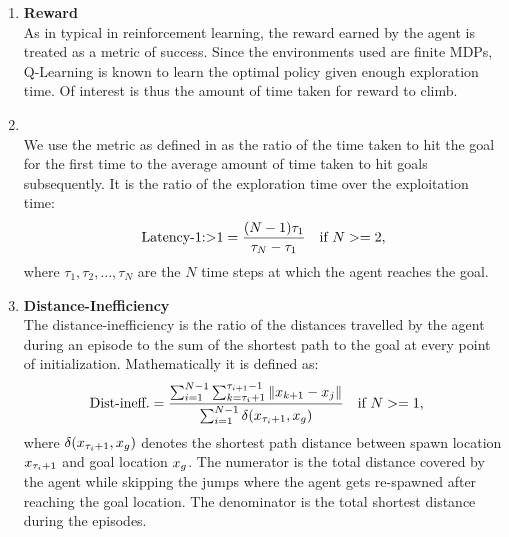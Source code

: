 \begin{enumerate}
    \item \textbf{Reward}\\\noindent
        As in typical in reinforcement learning, the reward earned by
        the agent is treated as a metric of success. Since the
        environments used are finite MDPs, Q-Learning is known to learn
        the optimal policy given enough exploration time. Of interest is
        thus the amount of time taken for reward to climb.

    \item \textbf{\Loo}\\
        We use the metric \Loo as defined in \cite{MiPaViICLR2017} as the ratio
        of the time taken to hit the goal for the first time to the average
        amount of time taken to hit goals subsequently. It
        is the ratio of the exploration time over the exploitation time:
		\begin{align}
			\text{Latency-1:\textgreater1} &= 
			\frac{(N-1) \tau_1}{\tau_{N} - \tau_1} & \text{if }  N >= 2,
		\end{align}%
        where $\tau_1, \tau_2, \dots, \tau_N$ are the $N$ time steps at which
        the agent reaches the goal.


    \item \textbf{Distance-Inefficiency}\\
        The distance-inefficiency is the ratio of the distances travelled by
        the agent during an episode to the sum of the shortest path to
        the goal at every point of initialization. Mathematically it is defined
        as: 
		\begin{align}
			\text{Dist-ineff.} &=
			\frac{ \sum_{i=1}^{N-1} \sum_{k=\tau_i + 1}^{\tau_{i+1} - 1} \|x_{k+1} - x_{j}\| }
			{ \sum_{i=1}^{N-1} \delta(x_{\tau_i + 1}, x_g) } \quad \text{if } N >= 1,
		\end{align}%
		where $\delta(x_{\tau_i +1}, x_g)$ denotes the shortest path
		distance between spawn location $x_{\tau_i+1}$ and goal location
        $x_g$. The numerator is the total distance covered by the agent while
        skipping the jumps where the agent gets re-spawned after reaching the
        goal location. The denominator is the total shortest distance during the
        episodes.


\end{enumerate}


